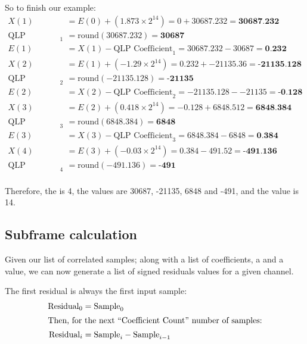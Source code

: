 So to finish our example:
{
\begin{align*}
X(1) &= E(0) + (1.873 \times 2 ^ {14} ) = 0 + 30687.232 = \textbf{30687.232} \\
\text{QLP Coefficient}_1 &= \text{round}(30687.232) = \textbf{30687} \\
E(1) &= X(1) - \text{QLP Coefficient}_1 = 30687.232 - 30687= \textbf{0.232} \\
X(2) &= E(1) + (-1.29 \times 2 ^ {14} ) = 0.232 + -21135.36 = \textbf{-21135.128} \\
\text{QLP Coefficient}_2 &= \text{round}(-21135.128) = \textbf{-21135} \\
E(2) &= X(2) - \text{QLP Coefficient}_2 = -21135.128 - -21135 = \textbf{-0.128} \\
X(3) &= E(2) + (0.418 \times 2 ^ {14} ) = -0.128 + 6848.512 = \textbf{6848.384} \\
\text{QLP Coefficient}_3 &= \text{round}(6848.384) = \textbf{6848} \\
E(3) &= X(3) - \text{QLP Coefficient}_3 = 6848.384 - 6848 = \textbf{0.384} \\
X(4) &= E(3) + (-0.03 \times 2 ^ {14} ) = 0.384 - 491.52 = \textbf{-491.136} \\
\text{QLP Coefficient}_4 &= \text{round}(-491.136) = \textbf{-491} \\
\end{align*}
}
\par
\noindent
Therefore, the  is 4,
the  values are 30687, -21135, 6848 and -491,
and the  value is 14.


\clearpage

\subsection{Subframe calculation}

Given our list of correlated samples; along with a list of
coefficients, a  and a 
value, we can now generate a list of signed residuals values
for a given channel.

The first residual is always the first input sample:
\begin{align*}
\text{Residual}_0 &= \text{Sample}_0 \\
\intertext{Then, for the next ``{Coefficient Count}'' number of samples:}
\text{Residual}_i &= \text{Sample}_i - \text{Sample}_{i - 1}
\end{align*}

